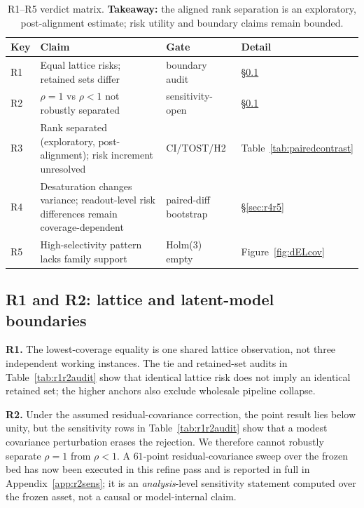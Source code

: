 \documentclass{article}
\begin{document}
\begin{table}[t]
\caption{R1--R5 verdict matrix.  \textbf{Takeaway:} the aligned rank separation is an
exploratory, post-alignment estimate; risk utility and boundary claims remain bounded.}
\label{tab:results}
\centering\small
\begin{tabularx}{\linewidth}{@{}l>{\raggedright\arraybackslash}Xll@{}}
\toprule
Key & Claim & Gate & Detail \\
\midrule
R1 & Equal lattice risks; retained sets differ & boundary audit & \S\ref{sec:r1r2} \\
R2 & $\rho=1$ vs $\rho<1$ not robustly separated & sensitivity-open & \S\ref{sec:r1r2} \\
R3 & Rank separated (exploratory, post-alignment); risk increment unresolved & CI/TOST/H2 & Table~\ref{tab:pairedcontrast} \\
R4 & Desaturation changes variance; readout-level risk differences remain coverage-dependent & paired-diff bootstrap & \S\ref{sec:r4r5} \\
R5 & High-selectivity pattern lacks family support & Holm(3) empty & Figure~\ref{fig:dELcov} \\
\bottomrule
\end{tabularx}
\end{table}

\subsection{R1 and R2: lattice and latent-model boundaries}
\label{sec:r1r2}

\textbf{R1.} The lowest-coverage equality is one shared lattice observation, not three
independent working instances.  The tie and retained-set audits in
Table~\ref{tab:r1r2audit} show that identical lattice risk does not imply an identical retained
set; the higher anchors also exclude wholesale pipeline collapse.

\textbf{R2.} Under the assumed residual-covariance correction, the point result lies below
unity, but the sensitivity rows in Table~\ref{tab:r1r2audit} show that a modest covariance
perturbation erases the rejection.  We therefore cannot robustly separate $\rho=1$ from
$\rho<1$.  A $61$-point residual-covariance sweep over the frozen bed has now been executed in
this refine pass and is reported in full in Appendix~\ref{app:r2sens}; it is an
\emph{analysis}-level sensitivity statement computed over the frozen asset, not a causal or
model-internal claim.
\end{document}
